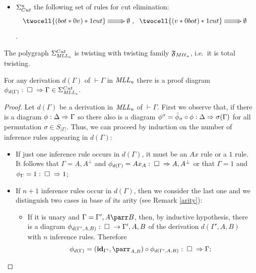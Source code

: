 \documentclass[a4paper]{article}
\begin{document}
\begin{definition}
\begin{itemize}
\begin{itemize}
\item  $\Sigma^{u}_{Cut}$  the following set of rules for cut elimination:
$$\xymatrix{ {\twocell{(bot *0 v)*1 cut }} \ar@3[r] & \emptyset },
\;
\xymatrix{ {\twocell{(v *0 bot)*1 cut }} \ar@3[r] & \emptyset }
$$.

\end{itemize}
\end{itemize}

\end{definition}

\begin{oss}
The polygraph $ \Sigma_{\mathit{MLL_u}}^{Cut}$ is twisting with twisting family ${\mathfrak{F}_{M\ell \ell _u}}$, i.e.~it is total twisting.
\end{oss}



\begin{theorem}\label{intmll}
For any derivation $d(\Gamma)$ of $\vdash \Gamma$ in $\mathit{MLL_u}$ there is a proof diagram $\phi_{d(\Gamma)}: \; \square \; \Rightarrow \Gamma\in \Sigma_{\mathit{MLL_u}}^{Cut}$.
\begin{proof}
Let $d(\Gamma)$ be a derivation in $\mathit{MLL_u}$ of $\vdash \Gamma$. First we observe that, if there is a diagram $\phi: \Delta \Rightarrow \Gamma$ so there also is a diagram $\phi^\sigma= \hat \phi_\sigma \circ \phi: \Delta \Rightarrow \sigma(\Gamma)$ for all permutation $\sigma\in S_{|\Gamma|}$. Thus,  we can proceed by induction on the number of inference rules appearing in $d(\Gamma)$:
\begin{itemize}
\item If just one inference rule occurs in $d(\Gamma)$, it must be an $Ax$ rule or  a $1$ rule. It follows that $\Gamma=A,A^\bot$ and $\phi_{d(\Gamma)}=Ax_A:\; \square \; \Rightarrow A, A^\bot$ or that $\Gamma=1$ and $\phi_\Gamma= 1: \; \square \; \Rightarrow 1$;




\item If $n+1$ inference rules occur in $d(\Gamma) $, then we consider the last one and we distinguish two cases in base of its arity (see Remark  \ref{arity}):
\begin{itemize}


\item If it is unary and $ \Gamma= \Gamma', A\parr B$, then, by inductive hypothesis, there is a diagram $\phi_{d(\Gamma',A,B)}: \; \square \; \rightarrow \Gamma',A,B$ of the derivation $d( \Gamma',A,B)$ with $n$ inference rules. Therefore
$$\phi_{d(\Gamma)}=(\id_{\Gamma'},\parr_{A,B}) \circ \phi_{d(\Gamma',A,B)}: \pro \frr \Gamma ;$$


\end{itemize}
\end{itemize}
\end{proof}
\end{theorem}
\end{document}
